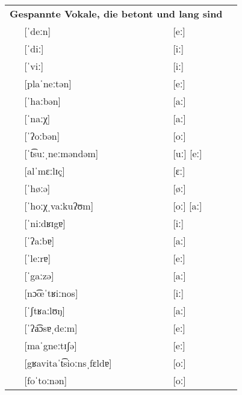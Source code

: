 \begin{longtable}[l]{p{0.1mm}lll}
  \multicolumn{3}{l}{\textbf{Gespannte Vokale, die betont und lang sind}}    \\
  & [ˈdeːn]                  & [eː]                                          \\
  & [ˈdiː]                   & [iː]                                          \\
  & [ˈviː]                   & [iː]                                          \\
  & [plaˈneːtən]             & [eː]                                          \\
  & [ˈhaːbən]                & [aː]                                          \\
  & [ˈnaːχ]                  & [aː]                                          \\
  & [ˈʔoːbən]                & [oː]                                          \\
  & [ˈt͡suːˌneːməndəm]        & [uː] [eː]                                     \\
  & [alˈmɛːlɪç]              & [ɛː]                                          \\
  & [ˈhøːə]                  & [øː]                                          \\
  & [ˈhoːχˌvaːkuʔʊm]         & [oː] [aː]                                     \\
  & [ˈniːdʁɪgɐ]              & [iː]                                          \\
  & [ˈʔaːbɐ]                 & [aː]                                          \\
  & [ˈleːrɐ]                 & [eː]                                          \\
  & [ˈgaːzə]                 & [aː]                                          \\
  & [nɔ͡œˈtʁiːnos]            & [iː]                                          \\
  & [ˈʃtʁaːlʊŋ]              & [aː]                                          \\
  & [ˈʔa͡ɔsɐˌdeːm]            & [eː]                                          \\
  & [maˈgneːtɪʃə]            & [eː]                                          \\
  & [gʁavitaˈt͡sioːnsˌfɛldɐ]  & [oː]                                          \\
  & [foˈtoːnən]              & [oː]                                          \\

\end{longtable}

